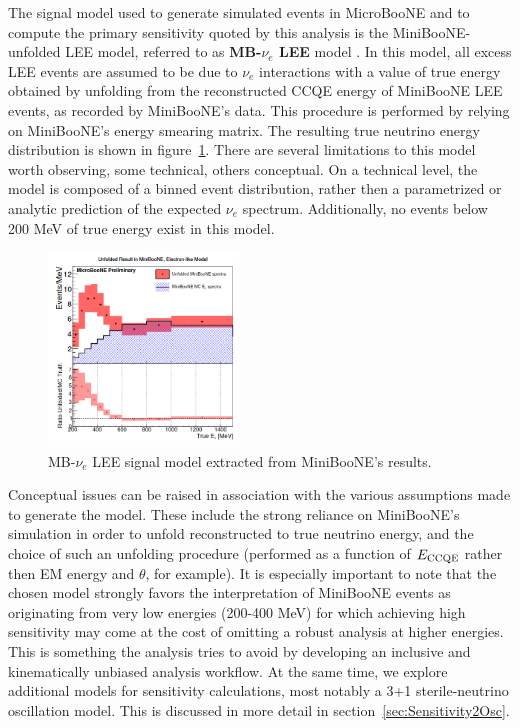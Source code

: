 \documentclass[a4paper]{article}
\begin{document}
\par  The signal model used to generate simulated events in MicroBooNE and to compute the primary sensitivity quoted by this analysis  is the MiniBooNE-unfolded LEE model, referred to as \textbf{MB-$\nu_e$ LEE} model \cite{C,C2}. In this model, all excess LEE events are assumed to be due to $\nu_e$ interactions with a value of true energy obtained by unfolding from the reconstructed CCQE energy of MiniBooNE LEE events, as recorded by MiniBooNE's data. This procedure is performed by relying on MiniBooNE's energy smearing matrix. The resulting true neutrino energy distribution is shown in figure~\ref{fig:minibooneunfolded}. There are several limitations to this model worth observing, some technical, others conceptual. On a technical level, the model is composed of a binned event distribution, rather then a parametrized or analytic prediction of the expected $\nu_e$ spectrum. Additionally, no events below 200 MeV of true energy exist in this model. 
\begin{figure}[ht]
\begin{center}
\includegraphics[width=0.45\textwidth]{introduction/unfoldedminiboone.png}
\caption{\label{fig:minibooneunfolded}MB-$\nu_e$ LEE signal model extracted from MiniBooNE's results.}
\end{center}
\end{figure}
Conceptual issues can be raised in association with the various assumptions made to generate the model. These include the strong reliance on MiniBooNE's simulation in order to unfold reconstructed to true neutrino energy, and the choice of such an unfolding procedure (performed as a function of $E_{\rm CCQE}$ rather then EM energy and $\theta$, for example).
It is especially important to note that the chosen model strongly favors the interpretation of MiniBooNE events as originating from very low energies (200-400 MeV) for which achieving high sensitivity may come at the cost of omitting a robust analysis at higher energies. This is something the analysis tries to avoid by developing an inclusive and kinematically unbiased analysis workflow. At the same time, we explore additional models for sensitivity calculations, most notably a 3+1 sterile-neutrino oscillation model. This is discussed in more detail in section~\ref{sec:Sensitivity2Osc}.
\end{document}
